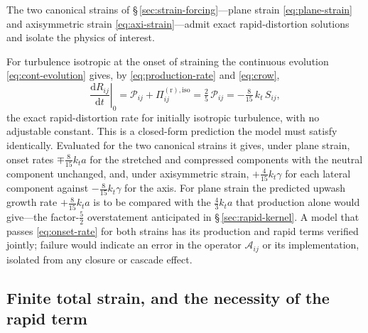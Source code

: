\documentclass[lineno]{JFM-FLM_Au}
\begin{document}
The two canonical strains of \S\,\ref{sec:strain-forcing}---plane strain
\eqref{eq:plane-strain} and axisymmetric strain
\eqref{eq:axi-strain}---admit exact rapid-distortion solutions and
isolate the physics of interest.

For turbulence isotropic at the onset of straining the continuous
evolution \eqref{eq:cont-evolution} gives, by
\eqref{eq:production-rate} and \eqref{eq:crow},
\begin{equation}
  \left.\frac{\mathrm{d}R_{ij}}{\mathrm{d}t}\right|_{0}
  = \mathcal{P}_{ij}+\Pi^{(\mathrm r),\mathrm{iso}}_{ij}
  = \tfrac{2}{5}\,\mathcal{P}_{ij}
  = -\tfrac{8}{15}\,k_t\,S_{ij},
  \label{eq:onset-rate}
\end{equation}
the exact rapid-distortion rate for initially isotropic turbulence, with
no adjustable constant. This is a
closed-form prediction the model must satisfy identically. Evaluated for the two canonical strains it gives, under
plane strain, onset rates $\mp\tfrac{8}{15}k_ta$ for the stretched and
compressed components with the neutral component unchanged, and, under
axisymmetric strain, $+\tfrac{4}{15}k_t\gamma$ for each lateral
component against $-\tfrac{8}{15}k_t\gamma$ for the axis. For plane
strain the predicted upwash growth rate $+\tfrac{8}{15}k_ta$ is to be
compared with the $\tfrac43k_ta$ that production alone would give---the
factor-$\tfrac52$ overstatement anticipated in
\S\,\ref{sec:rapid-kernel}. A model that passes \eqref{eq:onset-rate}
for both strains has its production and rapid terms verified jointly;
failure would indicate an error in the operator $\mathcal{A}_{ij}$ or
its implementation, isolated from any closure or cascade effect.

\subsection{Finite total strain, and the necessity of the rapid term}
\label{sec:finite-strain}
\end{document}
